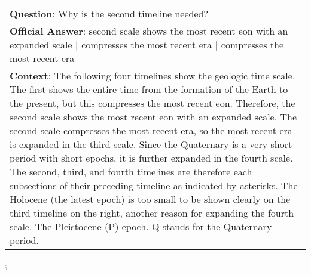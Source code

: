 \begin{figure*}[ht]
{\begin{tabular}{p{}}
            \textbf{Question}: Why is the second timeline needed?                                                                                                                                                                                                                                                                                                                                                                                                                                                                                                                                                                                                                                                                                                                                                                                                   \\
            \textbf{Official Answer}: second scale shows the most recent eon with an expanded scale \textbf{|} compresses the most recent era \textbf{|} compresses the most recent era                                                                                                                                                                                                                                                                                                                                                                                                                                                                                                                                                                                                                                                                             \\
            \textbf{Context}: The following four timelines show the geologic time scale. The first shows the entire time from the formation of the Earth to the present, but this compresses the most recent eon. Therefore, the second scale shows the most recent eon with an expanded scale. The second scale compresses the most recent era, so the most recent era is expanded in the third scale. Since the Quaternary is a very short period with short epochs, it is further expanded in the fourth scale. The second, third, and fourth timelines are therefore each subsections of their preceding timeline as indicated by asterisks. The Holocene (the latest epoch) is too small to be shown clearly on the third timeline on the right, another reason for expanding the fourth scale. The Pleistocene (P) epoch. Q stands for the Quaternary period. \\
        \end{tabular}
    };
    \label{fig:ex-572663a9f1498d1400e8ddf2}
\end{figure*}


